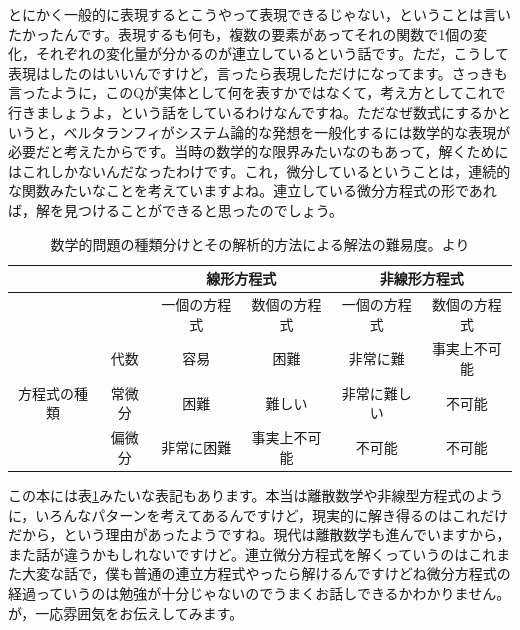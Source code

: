 \documentclass{ltjsbook}
\begin{document}
とにかく一般的に表現するとこうやって表現できるじゃない，ということは言いたかったんです。表現するも何も，複数の要素があってそれの関数で1個の変化，それぞれの変化量が分かるのが連立しているという話です。ただ，こうして表現はしたのはいいんですけど，言ったら表現しただけになってます。さっきも言ったように，このQが実体として何を表すかではなくて，考え方としてこれで行きましょうよ，という話をしているわけなんですね。ただなぜ数式にするかというと，ベルタランフィがシステム論的な発想を一般化するには数学的な表現が必要だと考えたからです。当時の数学的な限界みたいなのもあって，解くためにはこれしかないんだなったわけです。これ，微分しているということは，連続的な関数みたいなことを考えていますよね。連立している微分方程式の形であれば，解を見つけることができると思ったのでしょう。

\begin{table}[h!]
    \centering
    \caption{数学的問題の種類分けとその解析的方法による解法の難易度。\textcite{vonBertalanffy}より}
    \begin{tabular}{|c|c|c|c|c|c|}
        \hline
        & & \multicolumn{2}{c|}{線形方程式} & \multicolumn{2}{c|}{非線形方程式} \\ \hline
        & & 一個の方程式 & 数個の方程式 & 一個の方程式 & 数個の方程式 \\ \hline
        \multirow{3}{*}{方程式の種類} 
        & 代数 & 容易 & 困難 & 非常に難 & 事実上不可能 \\ \cline{2-6}
        & 常微分 & 困難 & 難しい & 非常に難しい & 不可能 \\ \cline{2-6}
        & 偏微分 & 非常に困難 & 事実上不可能 & 不可能 & 不可能 \\ \hline
    \end{tabular}
    \label{tab:math_difficulty}
\end{table}


この本には表\ref{tab:math_difficulty}みたいな表記もあります。本当は離散数学や非線型方程式のように，いろんなパターンを考えてあるんですけど，現実的に解き得るのはこれだけだから，という理由があったようですね。現代は離散数学も進んでいますから，また話が違うかもしれないですけど。連立微分方程式を解くっていうのはこれまた大変な話で，僕も普通の連立方程式やったら解けるんですけどね微分方程式の経過っていうのは勉強が十分じゃないのでうまくお話しできるかわかりません。が，一応雰囲気をお伝えしてみます。
\end{document}
